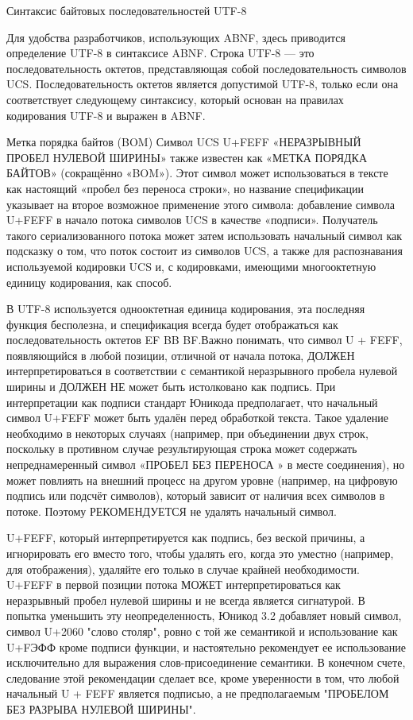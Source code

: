 \documentclass{ou}
\begin{document}
Синтаксис байтовых последовательностей UTF-8

 Для удобства разработчиков, использующих ABNF, здесь приводится определение UTF-8 в синтаксисе ABNF. Строка UTF-8 — это последовательность октетов, представляющая собой последовательность символов UCS. Последовательность октетов является допустимой UTF-8, только если она соответствует следующему синтаксису, который основан на правилах кодирования UTF-8 и выражен в ABNF.
 
Метка порядка байтов (BOM) Символ UCS U+FEFF «НЕРАЗРЫВНЫЙ ПРОБЕЛ НУЛЕВОЙ ШИРИНЫ» также известен как «МЕТКА ПОРЯДКА БАЙТОВ» (сокращённо «BOM»). Этот символ может использоваться в тексте как настоящий «пробел без переноса строки», но название спецификации указывает на второе возможное применение этого символа: добавление символа U+FEFF в начало потока символов UCS в качестве «подписи». Получатель такого сериализованного потока может затем использовать начальный символ как подсказку о том, что поток состоит из символов UCS, а также для распознавания используемой кодировки UCS и, с кодировками, имеющими многооктетную единицу кодирования, как способ.

В UTF-8 используется однооктетная единица кодирования, эта последняя функция бесполезна, и спецификация всегда будет отображаться как последовательность октетов EF BB BF.Важно понимать, что символ U + FEFF, появляющийся в любой позиции, отличной от начала потока, ДОЛЖЕН интерпретироваться в соответствии с семантикой неразрывного пробела нулевой ширины и ДОЛЖЕН НЕ может быть истолковано как подпись. При интерпретации как подписи стандарт Юникода предполагает, что начальный символ U+FEFF может быть удалён перед обработкой текста. Такое удаление необходимо в некоторых случаях (например, при объединении двух строк, поскольку в противном случае результирующая строка может содержать непреднамеренный символ «ПРОБЕЛ БЕЗ ПЕРЕНОСА » в месте соединения), но может повлиять на внешний процесс на другом уровне (например, на цифровую подпись или подсчёт символов), который зависит от наличия всех символов в потоке. Поэтому РЕКОМЕНДУЕТСЯ не удалять начальный символ.

 U+FEFF, который интерпретируется как подпись, без веской причины, а игнорировать его вместо того, чтобы удалять его, когда это уместно (например, для отображения), удаляйте его только в случае крайней необходимости. U+FEFF в первой позиции потока МОЖЕТ интерпретироваться как неразрывный пробел нулевой ширины и не всегда является сигнатурой. В попытка уменьшить эту неопределенность, Юникод 3.2 добавляет новый символ, символ U+2060 "слово столяр", ровно с той же семантикой и использование как U+FЭФФ кроме подписи функции, и настоятельно рекомендует ее использование исключительно для выражения слов-присоединение семантики. В конечном счете, следование этой рекомендации сделает все, кроме уверенности в том, что любой начальный U + FEFF является подписью, а не предполагаемым "ПРОБЕЛОМ БЕЗ РАЗРЫВА НУЛЕВОЙ ШИРИНЫ".
 
\end{document}
